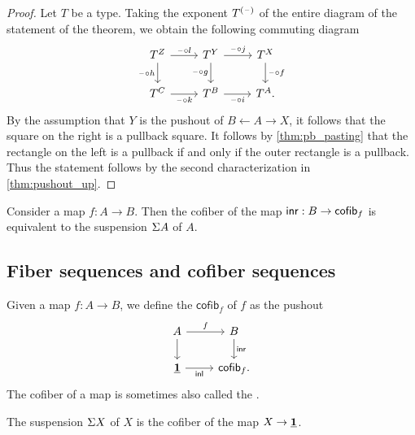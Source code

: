 \begin{proof}
Let $T$ be a type. Taking the exponent $T^{(\mathord{\hspace{1pt}\text{--}\hspace{1pt}})}$ of the entire diagram of the statement of the theorem, we obtain the following commuting diagram
\begin{equation*}
\begin{tikzcd}
T^Z \arrow[r,"\blank\circ l"] \arrow[d,swap,"\blank\circ h"] & T^Y \arrow[d,swap,"\blank\circ g"] \arrow[r,"\blank\circ j"] & T^X \arrow[d,"\blank\circ f"] \\
T^C \arrow[r,swap,"\blank\circ k"] & T^B \arrow[r,swap,"\blank\circ i"] & T^A.
\end{tikzcd}
\end{equation*}
By the assumption that $Y$ is the pushout of $B\leftarrow A \rightarrow X$, it follows that the square on the right is a pullback square. It follows by \cref{thm:pb_pasting} that the rectangle on the left is a pullback if and only if the outer rectangle is a pullback. Thus the statement follows by the second characterization in \cref{thm:pushout_up}.
\end{proof}

\begin{lem}
Consider a map $f:A\to B$. Then the cofiber of the map ${\mathsf{inr}}:B\to \mathsf{cofib}_f$ is equivalent to the suspension $\Sigma{A}$ of $A$. 
\end{lem}

\subsection{Fiber sequences and cofiber sequences}

\begin{defn}
Given a map $f:A\to B$, we define the  $\mathsf{cofib}_f$ of $f$ as the pushout
\begin{equation*}
\begin{tikzcd}
A \arrow[r,"f"] \arrow[d] & B \arrow[d,"\inr"] \\
\unit \arrow[r,swap,"\inl"] & \mathsf{cofib}_f. 
\end{tikzcd}
\end{equation*}
The cofiber of a map is sometimes also called the .
\end{defn}

\begin{eg}
The suspension $\Sigma X$ of $X$ is the cofiber of the map $X\to \underline{\mathbf{1}}$. 
\end{eg}

